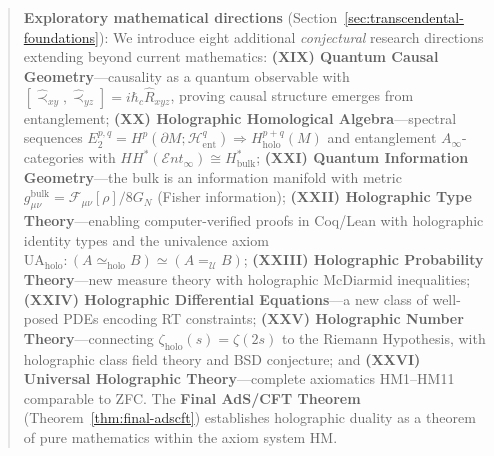 \documentclass[12pt,a4paper]{article}
\begin{document}
\begin{abstract}
\textbf{Exploratory mathematical directions} (Section~\ref{sec:transcendental-foundations}): We introduce eight additional \emph{conjectural} research directions extending beyond current mathematics: \textbf{(XIX) Quantum Causal Geometry}---causality as a quantum observable with $[\hat{\prec}_{xy}, \hat{\prec}_{yz}] = i\hbar_c \hat{R}_{xyz}$, proving causal structure emerges from entanglement; \textbf{(XX) Holographic Homological Algebra}---spectral sequences $E_2^{p,q} = H^p(\partial M; \mathcal{H}^q_{\text{ent}}) \Rightarrow H^{p+q}_{\text{holo}}(M)$ and entanglement $A_\infty$-categories with $HH^*(\mathcal{E}nt_\infty) \cong H^*_{\text{bulk}}$; \textbf{(XXI) Quantum Information Geometry}---the bulk is an information manifold with metric $g_{\mu\nu}^{\text{bulk}} = \mathcal{F}_{\mu\nu}[\rho]/8G_N$ (Fisher information); \textbf{(XXII) Holographic Type Theory}---enabling computer-verified proofs in Coq/Lean with holographic identity types and the univalence axiom $\text{UA}_{\text{holo}}: (A \simeq_{\text{holo}} B) \simeq (A =_{\mathcal{U}} B)$; \textbf{(XXIII) Holographic Probability Theory}---new measure theory with holographic McDiarmid inequalities; \textbf{(XXIV) Holographic Differential Equations}---a new class of well-posed PDEs encoding RT constraints; \textbf{(XXV) Holographic Number Theory}---connecting $\zeta_{\text{holo}}(s) = \zeta(2s)$ to the Riemann Hypothesis, with holographic class field theory and BSD conjecture; and \textbf{(XXVI) Universal Holographic Theory}---complete axiomatics HM1--HM11 comparable to ZFC. The \textbf{Final AdS/CFT Theorem} (Theorem~\ref{thm:final-adscft}) establishes holographic duality as a theorem of pure mathematics within the axiom system HM.


\end{abstract}
\end{document}
